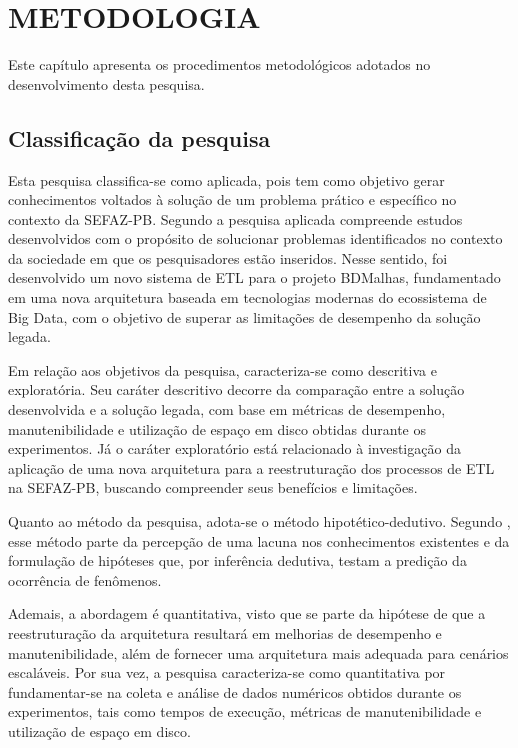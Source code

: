 
\chapter{METODOLOGIA}
\thispagestyle{myheadings}

Este capítulo apresenta os procedimentos metodológicos adotados no desenvolvimento desta pesquisa.

\section{Classificação da pesquisa}

Esta pesquisa classifica-se como aplicada, pois tem como objetivo gerar 
conhecimentos voltados à solução de um problema prático e específico no contexto da 
SEFAZ-PB. Segundo  a pesquisa aplicada compreende estudos desenvolvidos 
com o propósito de solucionar problemas identificados no contexto da sociedade em que os pesquisadores 
estão inseridos. Nesse sentido, foi desenvolvido um novo sistema de ETL para o projeto BDMalhas, 
fundamentado em uma nova arquitetura baseada em tecnologias modernas do ecossistema de Big Data, 
com o objetivo de superar as limitações de desempenho da solução legada.

Em relação aos objetivos da pesquisa, caracteriza-se como descritiva e exploratória. 
Seu caráter descritivo decorre da comparação entre a solução desenvolvida e a solução legada, 
com base em métricas de desempenho, manutenibilidade e utilização de espaço em disco obtidas 
durante os experimentos. Já o caráter exploratório está relacionado à investigação da aplicação 
de uma nova arquitetura para a reestruturação dos processos de ETL na SEFAZ-PB, 
buscando compreender seus benefícios e limitações.

Quanto ao método da pesquisa, adota-se o método hipotético-dedutivo. Segundo
, esse método parte da percepção de uma lacuna nos conhecimentos
existentes e da formulação de hipóteses que, por inferência dedutiva, testam a predição da
ocorrência de fenômenos.

Ademais, a abordagem é quantitativa, visto que se parte da hipótese de que a reestruturação da arquitetura 
resultará em melhorias de desempenho e manutenibilidade, além de fornecer uma arquitetura mais adequada 
para cenários escaláveis. Por sua vez, a pesquisa caracteriza-se como quantitativa por fundamentar-se na 
coleta e análise de dados numéricos obtidos durante os experimentos, tais como tempos de execução, métricas 
de manutenibilidade e utilização de espaço em disco.

